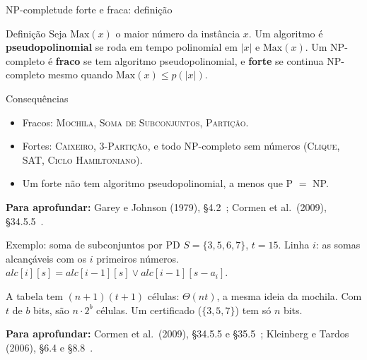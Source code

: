 \documentclass[aspectratio=169,xcolor=table]{beamer}
\newcommand{\fonte}[1]{%
  \vfill
  {\tiny\color{gray!55!black}\textbf{Para aprofundar:} #1\par}%
}
\newcommand{\prob}[1]{\textsc{#1}}
\begin{document}
\begin{frame}{NP-completude forte e fraca: definição}
  \begin{block}{Definição}
    \small
    Seja $\mathrm{Max}(x)$ o maior número da instância $x$. Um algoritmo é
    \textbf{pseudopolinomial} se roda em tempo polinomial em $|x|$ e $\mathrm{Max}(x)$.
    Um NP-completo é \textbf{fraco} se tem algoritmo pseudopolinomial, e \textbf{forte} se
    continua NP-completo mesmo quando $\mathrm{Max}(x) \le p(|x|)$.
  \end{block}
  \begin{exampleblock}{Consequências}
    \scriptsize
    \begin{itemize}
      \item Fracos: \prob{Mochila}, \prob{Soma de Subconjuntos}, \prob{Partição}.
      \item Fortes: \prob{Caixeiro}, \prob{3-Partição}, e todo NP-completo sem números
            (\prob{Clique}, \prob{SAT}, \prob{Ciclo Hamiltoniano}).
      \item Um forte não tem algoritmo pseudopolinomial, a menos que P $=$ NP.
    \end{itemize}
  \end{exampleblock}
  \fonte{Garey e Johnson (1979), \S 4.2~\cite{garey1979computers};
    Cormen et al.\ (2009), \S 34.5.5~\cite{cormen2009introduction}.}
\end{frame}

\begin{frame}{Exemplo: soma de subconjuntos por PD}
  \scriptsize
  $S = \{3, 5, 6, 7\}$, $t = 15$. Linha $i$: as somas alcançáveis com os $i$ primeiros
  números. $\mathit{alc}[i][s] = \mathit{alc}[i-1][s] \lor \mathit{alc}[i-1][s - a_i]$.
  \begin{center}
  \end{center}
  A tabela tem $(n+1)(t+1)$ células: $\Theta(nt)$, a mesma ideia da mochila. Com $t$ de $b$
  bits, são $n \cdot 2^b$ células. Um certificado ($\{3,5,7\}$) tem só $n$ bits.
  \fonte{Cormen et al.\ (2009), \S 34.5.5 e \S 35.5~\cite{cormen2009introduction};
    Kleinberg e Tardos (2006), \S 6.4 e \S 8.8~\cite{kleinberg2006algorithm}.}
\end{frame}
\end{document}
